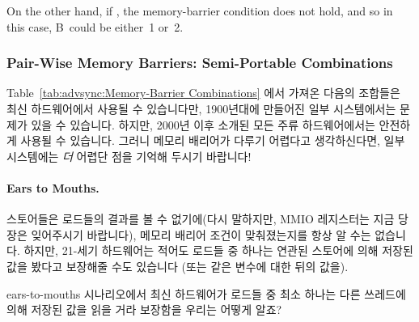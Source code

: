 	On the other hand, if , the memory-barrier condition
	does not hold, and so in this case, B~could be either~1 or~2.
	\fi

\subsubsection{Pair-Wise Memory Barriers: Semi-Portable Combinations}

Table~\ref{tab:advsync:Memory-Barrier Combinations} 에서 가져온 다음의 조합들은
최신 하드웨어에서 사용될 수 있습니다만, 1900년대에 만들어진 일부 시스템에서는
문제가 있을 수 있습니다.
하지만, 2000년 이후 소개된 모든 주류 하드웨어에서는 안전하게 사용될 수
있습니다.
그러니 메모리 배리어가 다루기 어렵다고 생각하신다면, 일부 시스템에는 \emph{더}
어렵단 점을 기억해 두시기 바랍니다!

\paragraph{Ears to Mouths.}
	스토어들은 로드들의 결과를 볼 수 없기에(다시 말하지만, MMIO 레지스터는
	지금 당장은 잊어주시기 바랍니다), 메모리 배리어 조건이 맞춰졌는지를
	항상 알 수는 없습니다.
	하지만, 21-세기 하드웨어는 적어도 로드들 중 하나는 연관된 스토어에 의해
	저장된 값을 봤다고 보장해줄 수도 있습니다 (또는 같은 변수에 대한 뒤의
	값을).

\QuickQuiz{}
	ears-to-mouths 시나리오에서 최신 하드웨어가 로드들 중 최소 하나는 다른
	쓰레드에 의해 저장된 값을 읽을 거라 보장함을 우리는 어떻게 알죠?
	\iffalse


